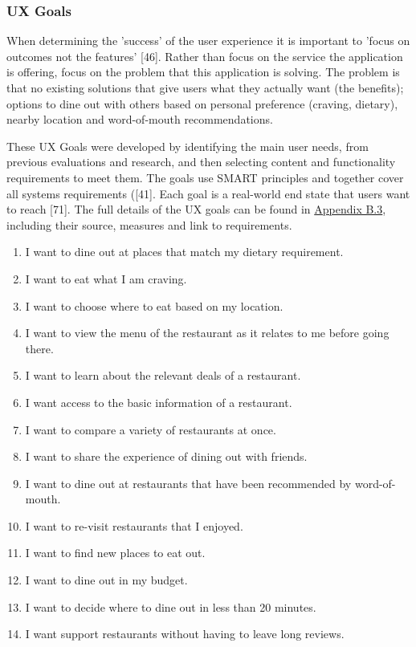 \documentclass[a4 paper, 12pt]{article}
\begin{document}
    \subsubsection{UX Goals}
    When determining the 'success' of the user experience it is important to 'focus on outcomes not the features' [46]. Rather than focus on the service the application is offering, focus on the problem that this application is solving. The problem is that no existing solutions that give users what they actually want (the benefits); options to dine out with others based on personal preference (craving, dietary), nearby location and word-of-mouth recommendations.

    These UX Goals were developed by identifying the main user needs, from previous evaluations and research, and then selecting content and functionality requirements to meet them. The goals use SMART principles and together cover all systems requirements ([41]. Each goal is a real-world end state that users want to reach [71]. The full details of the UX goals can be found in \hyperref[sec:B.3]{Appendix B.3}, including their source, measures and link to requirements.
        \begin{enumerate}
            \item I want to dine out at places that match my dietary requirement.
            \item I want to eat what I am craving.
            \item I want to choose where to eat based on my location. 
            \item I want to view the menu of the restaurant as it relates to me before going there.
            \item I want to learn about the relevant deals of a restaurant.
            \item I want access to the basic information of a restaurant.
            \item I want to compare a variety of restaurants at once.
            \item I want to share the experience of dining out with friends.
            \item I want to dine out at restaurants that have been recommended by word-of-mouth.
            \item I want to re-visit restaurants that I enjoyed.
            \item I want to find new places to eat out.
            \item I want to dine out in my budget.
            \item I want to decide where to dine out in less than 20 minutes.
            \item I want support restaurants without having to leave long reviews.
        \end{enumerate}
\end{document}
